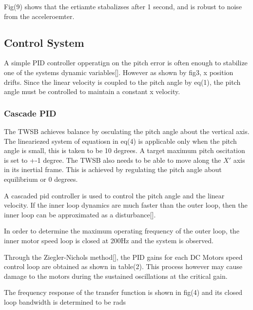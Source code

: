         Fig(9) shows that the ertiamte stabalizses after 1 second, 
        and is robust to noise from the acceleroemter. 
        \pagebreak{}
    \subsection{Control System}
       
        A simple PID controller opperatign on the pitch error is often enough to stabilize one of the systems dynamic variables[].
        However as shown by fig3, x position drifts. Since the linear velocity is coupled to the
        pitch angle by eq(1), the pitch angle must be controlled to maintain a constant x velocity. 

        \subsubsection{Cascade PID}

        The TWSB achieves balance by osculating the pitch angle about the vertical axis. 
        The lineariezed system of equatiosn in eq(4) is applicable 
        only when the pitch angle is small, this is taken to be 10 degrees. 
        A target maximum pitch oscitation is set to +-1 degree. 
        The TWSB also needs to be able to move along the $X'$ axis in its inertial frame.
        This is achieved by regulating the pitch angle about equilibrium or 0 degrees.

        A cascaded pid controller is used to control the pitch angle and the linear velocity. 
        If the inner loop dynamics are much faster than the outer loop, 
        then the inner loop can be approximated as a disturbance[].



        In order to determine the maximum operating frequency of the outer loop, 
        the inner motor speed loop is closed at 200Hz and the system is observed.
        
        Through the Ziegler-Nichols method[], the PID gains for each DC Motors speed control loop 
        are obtained as shown in table(2). This process however may cause damage to the motors 
        during the sustained oscillations at the critical gain. 
       
        

        

        The frequency response of the transfer function is shown in fig(4) and its closed loop bandwidth is determined to be rads

